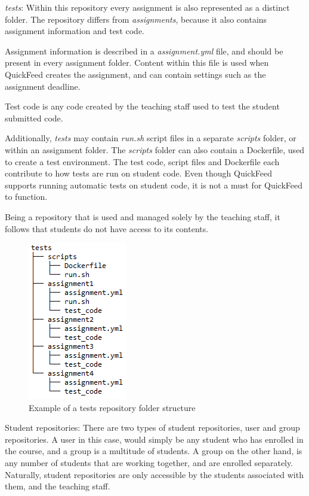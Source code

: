 \textit{tests}: Within this repository every assignment is also represented as a distinct folder.
The repository differs from \textit{assignments}, because it also contains assignment information and test code.

Assignment information is described in a \textit{assignment.yml} file, and should be present in every assignment folder.
Content within this file is used when QuickFeed creates the assignment, and can contain settings such as the assignment deadline.

Test code is any code created by the teaching staff used to test the student submitted code.

Additionally, \textit{tests} may contain \textit{run.sh} script files in a separate \textit{scripts} folder, or within an assignment folder.
The \textit{scripts} folder can also contain a Dockerfile, used to create a test environment.
The test code, script files and Dockerfile each contribute to how tests are run on student code.
Even though QuickFeed supports running automatic tests on student code, it is not a must for QuickFeed to function.

Being a repository that is used and managed solely by the teaching staff, it follows that students do not have access to its contents.

\begin{figure}[ht]
    \centering
    \includegraphics[scale=0.8]{photos/tests-repository-structure.PNG}
    \caption{Example of a tests repository folder structure}
    \label{fig:tests-repository-structure}
\end{figure}

Student repositories: There are two types of student repositories, user and group repositories.
A user in this case, would simply be any student who has enrolled in the course, and a group is a multitude of students.
A group on the other hand, is any number of students that are working together, and are enrolled separately.
Naturally, student repositories are only accessible by the students associated with them, and the teaching staff.

